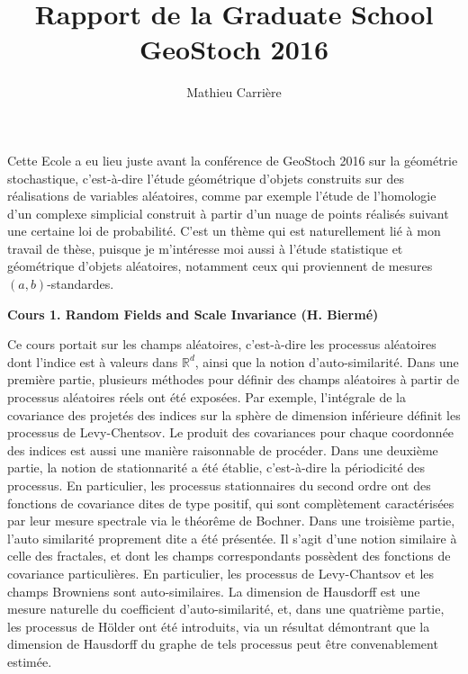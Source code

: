 \documentclass[a4paper, 11pt]{article}
\begin{document}
 
\title{Rapport de la Graduate School GeoStoch 2016}
\author{Mathieu Carri\`ere}
\date{}
 
\maketitle

Cette Ecole a eu lieu juste avant la conf\'erence de GeoStoch 2016 sur la g\'eom\'etrie stochastique, c'est-\`a-dire l'\'etude g\'eom\'etrique
d'objets construits sur des r\'ealisations de variables al\'eatoires, comme par exemple l'\'etude de l'homologie d'un complexe
simplicial construit \`a partir d'un nuage de points r\'ealis\'es suivant une certaine loi de probabilit\'e.
C'est un th\`eme qui est naturellement li\'e \`a mon travail de th\`ese, puisque je m'int\'eresse moi aussi \`a l'\'etude statistique et
g\'eom\'etrique d'objets al\'eatoires, notamment ceux qui proviennent de mesures $(a,b)$-standardes.

\begin{center} \textbf{Cours 1. Random Fields and Scale Invariance (H. Bierm\'e)} \end{center}

Ce cours portait sur les champs al\'eatoires, c'est-\`a-dire les processus al\'eatoires dont l'indice est \`a valeurs
dans $\mathbb{R}^d$, ainsi que la notion d'auto-similarit\'e. 
Dans une premi\`ere partie, plusieurs m\'ethodes pour d\'efinir des champs al\'eatoires \`a partir de processus
al\'eatoires r\'eels ont \'et\'e expos\'ees. Par exemple, l'int\'egrale de la covariance des projet\'es des indices sur la sph\`ere de
dimension inf\'erieure d\'efinit les processus de Levy-Chentsov. Le produit des covariances pour chaque coordonn\'ee des indices
est aussi une mani\`ere raisonnable de proc\'eder.
Dans une deuxi\`eme partie, la notion de stationnarit\'e a \'et\'e \'etablie, c'est-\`a-dire la p\'eriodicit\'e des processus. 
En particulier, les processus stationnaires du second ordre ont des fonctions de covariance dites de type positif,
qui sont compl\`etement caract\'eris\'ees par leur mesure spectrale via le th\'eorême de Bochner.
Dans une troisi\`eme partie, l'auto similarit\'e proprement dite a \'et\'e pr\'esent\'ee. Il s'agit d'une notion similaire
\`a celle des fractales, et dont les champs correspondants poss\`edent des fonctions de covariance particuli\`eres.
En particulier, les processus de Levy-Chantsov et les champs Browniens sont auto-similaires.
La dimension de Hausdorff est une mesure naturelle du coefficient d'auto-similarit\'e, et, dans une quatri\`eme partie,
les processus de Hölder ont \'et\'e introduits, via un r\'esultat d\'emontrant que la dimension de Hausdorff du graphe
de tels processus peut être convenablement estim\'ee.
\end{document}
